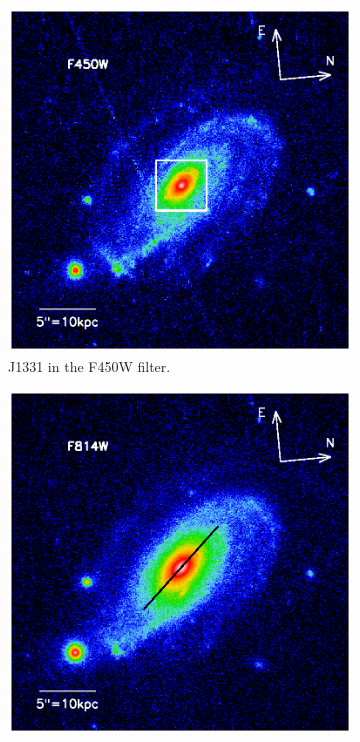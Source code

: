 \documentclass[useAMS,usenatbib]{mnras}
\begin{document}
\begin{figure}
\centering
\begin{subfigure}{.5\textwidth}
  \centering
  \includegraphics[width=.9\linewidth]{fig/first_glimpse_450.ps}
  \caption{J1331 in the F450W filter.}
  \label{fig:F450W}
\end{subfigure}%
\begin{subfigure}{.5\textwidth}
  \centering
  \includegraphics[width=.9\linewidth]{fig/first_glimpse_814.ps}

\end{subfigure}
\end{figure}
\end{document}
